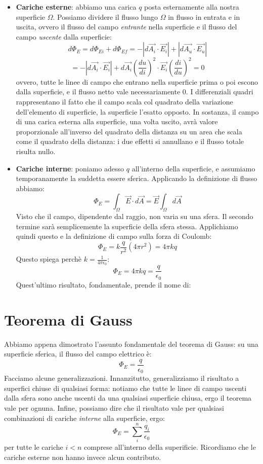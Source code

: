 \documentclass[a4paper,12pt]{article}
\begin{document}
\begin{itemize}
  \item \textbf{Cariche esterne}: abbiamo una carica $q$ posta esternamente alla nostra superficie $\Omega$. Possiamo dividere il flusso lungo $\Omega$ in flusso in entrata e in uscita, ovvero il flusso del campo \textit{entrante} nella superficie
    e il flusso del campo \textit{uscente} dalla superficie:
    $$ d\Phi_E = d\Phi_{Ei} + d\Phi_{Ef} = -|d\vec{A_i} \cdot \vec{E_i}| + |d\vec{A_u} \cdot \vec{E_u}| $$
    $$ = -|d\vec{A_i} \cdot \vec{E_i}| + d\vec{A_i}\left(\frac{du}{di}\right)^2 \cdot \vec{E_i}\left(\frac{di}{du}\right)^2 = 0 $$
    ovvero, tutte le linee di campo che entrano nella superficie prima o poi escono dalla superficie, e il flusso netto vale necessariamente 0. I differenziali quadri rappresentano il fatto che il campo scala col quadrato della variazione dell'elemento di superficie,
    la superficie l'esatto opposto. In sostanza, il campo di una carica esterna alla superficie, una volta uscito, avrà valore proporzionale all'inverso del quadrato della distanza su un area che scala come il quadrato della distanza:
    i due effetti si annullano e il flusso totale risulta nullo.
  \item \textbf{Cariche interne}: poniamo adesso $q$ all'interno della superficie, e assumiamo temporanamente la suddetta essere sferica. Applicando la definizione di flusso abbiamo:
    $$ \Phi_E = \int_\Omega \vec{E} \cdot d\vec{A} = \vec{E} \int_\Omega d\vec{A} $$
    Visto che il campo, dipendente dal raggio, non varia su una sfera. Il secondo termine sarà semplicemente la superficie della sfera stessa. Applichiamo quindi questo e la definizione di campo sulla forza di Coulomb:
    $$ \Phi_E = k \frac{q}{r^2} (4\pi r^2) = 4\pi kq $$
    Questo spiega perchè $ k = \frac{1}{4\pi \epsilon_0}$:
    $$ \Phi_E = 4\pi kq = \frac{q}{\epsilon_0}$$
    Quest'ultimo risultato, fondamentale, prende il nome di:
\end{itemize}
\section{Teorema di Gauss}
Abbiamo appena dimostrato l'assunto fondamentale del teorema di Gauss: su una superficie sferica, il flusso del campo elettrico è:
$$ \Phi_E = \frac{q}{\epsilon_0}$$
Facciamo alcune generalizzazioni. Innanzitutto, generalizziamo il risultato a superfici chiuse di qualsiasi forma: notiamo che tutte le linee di campo uscenti dalla sfera sono anche uscenti da una qualsiasi superficie chiusa, ergo il teorema vale per
ognuna. Infine, possiamo dire che il risultato vale per qualsiasi combinazioni di cariche \textit{interne} alla superficie, ergo:
$$ \Phi_E = \sum_i^n \frac{q_i}{\epsilon_0} $$
per tutte le cariche $i < n$ comprese all'interno della superificie. Ricordiamo che le cariche esterne non hanno invece alcun contributo.
\end{document}
